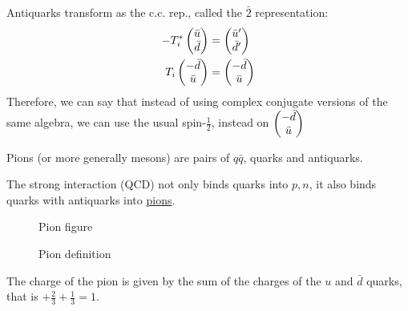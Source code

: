 Antiquarks transform as the c.c. rep., called the $\bar{2}$ representation:
\begin{align*}
  -T_i^*\pmqty{\bar{u}\\\bar{d}}&=\pmqty{\bar{u}'\\\bar{d}'}\\
  T_i\pmqty{-\bar{d}\\\bar{u}}&=\pmqty{-\bar{d}\\\bar{u}}
\end{align*}
Therefore, we can say that instead of using complex conjugate versions of the same algebra, we can use the usual spin-$\frac12$, instead on $\pmqty{-\bar{d}\\\bar{u}}$
\begin{definition}[Pions]
  Pions (or more generally mesons) are pairs of $q\bar{q}$, quarks and antiquarks.
\end{definition}
The strong interaction (QCD) not only binds quarks into $p,n$, it also binds quarks with antiquarks into \underline{pions}.

\begin{figure}[H]
  \centering
  \begin{TODO}
    Pion figure
  \end{TODO}
  \caption{Pion definition}
  \label{fig:pion}
\end{figure}
The charge of the pion is given by the sum of the charges of the $u$ and $\bar{d}$ quarks, that is $+\frac23+\frac13=1$.

